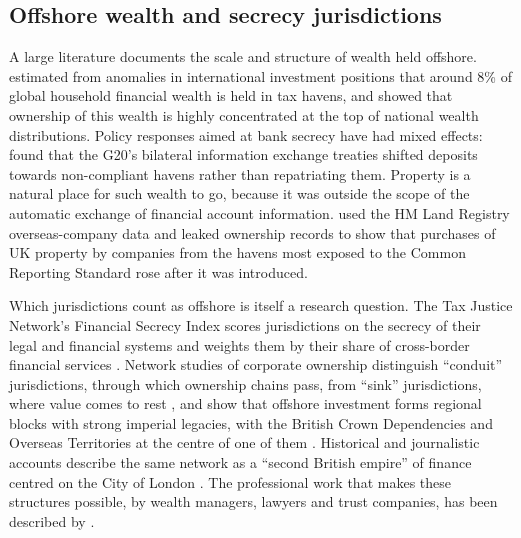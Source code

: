 \documentclass[11pt,a4paper]{article}
\begin{document}
\subsection{Offshore wealth and secrecy jurisdictions}
A large literature documents the scale and structure of wealth held offshore. \citet{zucman2013} estimated from anomalies in international investment positions that around 8\% of global household financial wealth is held in tax havens, and \citet{alstadsaeter2018} showed that ownership of this wealth is highly concentrated at the top of national wealth distributions. Policy responses aimed at bank secrecy have had mixed effects: \citet{johannesen2014} found that the G20's bilateral information exchange treaties shifted deposits towards non-compliant havens rather than repatriating them. Property is a natural place for such wealth to go, because it was outside the scope of the automatic exchange of financial account information. \citet{bomare2022} used the HM Land Registry overseas-company data and leaked ownership records to show that purchases of UK property by companies from the havens most exposed to the Common Reporting Standard rose after it was introduced.

Which jurisdictions count as offshore is itself a research question. The Tax Justice Network's Financial Secrecy Index scores jurisdictions on the secrecy of their legal and financial systems and weights them by their share of cross-border financial services \citep{cobham2015,tjn2018}. Network studies of corporate ownership distinguish ``conduit'' jurisdictions, through which ownership chains pass, from ``sink'' jurisdictions, where value comes to rest \citep{garcia2017}, and show that offshore investment forms regional blocks with strong imperial legacies, with the British Crown Dependencies and Overseas Territories at the centre of one of them \citep{haberly2015a,haberly2015b}. Historical and journalistic accounts describe the same network as a ``second British empire'' of finance centred on the City of London \citep{palan2010,shaxson2011}. The professional work that makes these structures possible, by wealth managers, lawyers and trust companies, has been described by \citet{harrington2016}.
\end{document}
